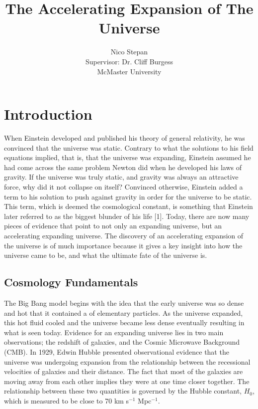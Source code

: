 \documentclass[12pt]{article}
\begin{document}
	\title{The Accelerating Expansion of The Universe} %
	\author{Nico Stepan \\ Supervisor: Dr. Cliff Burgess \\ McMaster University}
	\date{}
	
	\maketitle
	\thispagestyle{empty}
	\newpage
	\tableofcontents
	\newpage
	
	
	\section{Introduction}
When Einstein developed and published his theory of general relativity, he was convinced that the universe was static. Contrary to what the solutions to his field equations implied, that is, that the universe was expanding, Einstein assumed he had come across the same problem Newton did when he developed his laws of gravity. If the universe was truly static, and gravity was always an attractive force, why did it not collapse on itself? Convinced otherwise, Einstein added a term to his solution to push against gravity in order for the universe to be static. This term, which is deemed the cosmological constant, is something that Einstein later referred to as the biggest blunder of his life [1]. Today, there are now many pieces of evidence that point to not only an expanding universe, but an accelerating expanding universe. The discovery of an accelerating expansion of the universe is of much importance because it gives a key insight into how the universe came to be, and what the ultimate fate of the universe is.
	\\ 
	

 
	\subsection{Cosmology Fundamentals}
	
The Big Bang model begins with the idea that the early universe was so dense and hot that it contained a  of elementary particles. As the universe expanded, this hot fluid cooled and the universe became less dense eventually resulting in what is seen today. Evidence for an expanding universe lies in two main observations; the redshift of galaxies, and the Cosmic Microwave Background (CMB).
In 1929, Edwin Hubble presented observational evidence that the universe was undergoing expansion from the relationship between the recessional velocities of galaxies and their distance. The fact that most of the galaxies are moving away from each other implies they were at one time closer together. The relationship between these two quantities is governed by the Hubble constant, $H_0$, which is measured to be close to 70 km s$^{-1}$ Mpc$^{-1}$.
\end{document}
